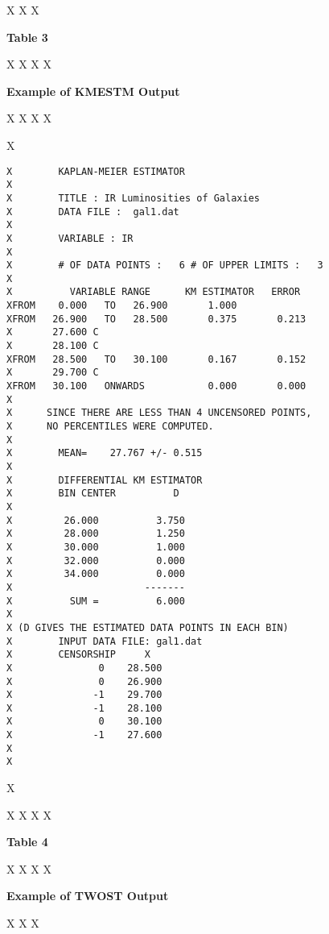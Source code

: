 X\newpage
X
X\centerline{\Large\bf Table 3}
X
X\bigskip
X
X\centerline{\large\bf Example of KMESTM Output}
X
X\bigskip
X
X\begin{small}
X\begin{verbatim}
X        KAPLAN-MEIER ESTIMATOR
X    
X        TITLE : IR Luminosities of Galaxies                                                     
X        DATA FILE :  gal1.dat
X    
X        VARIABLE : IR       
X    
X        # OF DATA POINTS :   6 # OF UPPER LIMITS :   3
X    
X          VARIABLE RANGE      KM ESTIMATOR   ERROR
XFROM    0.000   TO   26.900       1.000
XFROM   26.900   TO   28.500       0.375       0.213
X       27.600 C 
X       28.100 C 
XFROM   28.500   TO   30.100       0.167       0.152
X       29.700 C 
XFROM   30.100   ONWARDS           0.000       0.000
X
X      SINCE THERE ARE LESS THAN 4 UNCENSORED POINTS,
X      NO PERCENTILES WERE COMPUTED.
X    
X        MEAN=    27.767 +/- 0.515
X  
X        DIFFERENTIAL KM ESTIMATOR
X        BIN CENTER          D
X  
X         26.000          3.750
X         28.000          1.250
X         30.000          1.000
X         32.000          0.000
X         34.000          0.000
X                       -------
X          SUM =          6.000
X  
X (D GIVES THE ESTIMATED DATA POINTS IN EACH BIN)
X        INPUT DATA FILE: gal1.dat 
X        CENSORSHIP     X 
X               0    28.500
X               0    26.900
X              -1    29.700
X              -1    28.100
X               0    30.100
X              -1    27.600
X
X\end{verbatim}
X\end{small}
X\newpage
X
X
X\centerline{\Large\bf Table 4}
X
X\bigskip
X
X\centerline{\large\bf Example of TWOST Output}
X
X\bigskip
X
